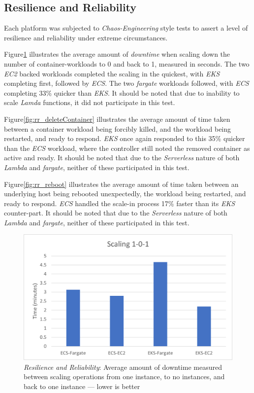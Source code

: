 \subsection{Resilience and Reliability}
Each platform was subjected to \textit{Chaos-Engineering} style tests to assert a level of resilience and reliability under extreme circumstances.

Figure\ref{fig:rr_scaling} illustrates the average amount of \textit{downtime} when scaling down the number of container-workloads to 0 and back to 1, measured in seconds.
The two \textit{EC2} backed workloads completed the scaling in the quickest, with \textit{EKS} completing first, followed by \textit{ECS}.
The two \textit{fargate} workloads followed, with \textit{ECS} completing 33\% quicker than \textit{EKS}.
It should be noted that due to inability to scale \textit{Lamda} functions, it did not participate in this test.

Figure\ref{fig:rr_deleteContainer} illustrates the average amount of time taken between a container workload being forcibly killed, and the workload being restarted, and ready to respond.
\textit{EKS} once again responded to this 35\% quicker than the \textit{ECS} workload, where the controller still noted the removed container as active and ready.
It should be noted that due to the \textit{Serverless} nature of both \textit{Lambda} and \textit{fargate}, neither of these participated in this test.

Figure\ref{fig:rr_reboot} illustrates the average amount of time taken between an underlying host being rebooted unexpectedly, the workload being restarted, and ready to respond.
\textit{ECS} handled the scale-in process 17\% faster than its \textit{EKS} counter-part.
It should be noted that due to the \textit{Serverless} nature of both \textit{Lambda} and \textit{fargate}, neither of these participated in this test.

\begin{figure}[htbp]
  \includegraphics[width=\textwidth]{images/rr-scaling.png}
  \caption{\emph{Resilience and Reliability}: Average amount of downtime measured between scaling operations from one instance, to no instances, and back to one instance --- lower is better}
  \label{fig:rr_scaling}
\end{figure}

